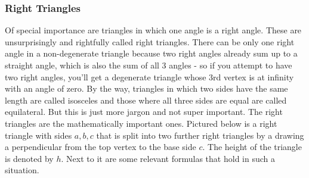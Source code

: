 


\subsubsection{Right Triangles}
Of special importance are triangles in which one angle is a right angle. These are unsurprisingly and rightfully called right triangles. There can be only one right angle in a non-degenerate triangle because two right angles already sum up to a straight angle, which is also the sum of all 3 angles - so if you attempt to have two right angles, you'll get a degenerate triangle whose 3rd vertex is at infinity with an angle of zero. By the way, triangles in which two sides have the same length are called isosceles and those where all three sides are equal are called equilateral. But this is just more jargon and not super important. The right triangles are the mathematically important ones. Pictured below is a right triangle with sides $a,b,c$ that is split into two further right triangles by a drawing a perpendicular from the top vertex to the base side $c$. The height of the triangle is denoted by $h$. Next to it are some relevant formulas that hold in such a situation.

\medskip
{}
\medskip


